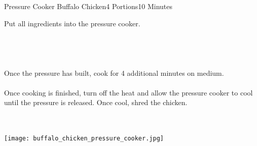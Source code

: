 \begin{recipe}{Pressure Cooker Buffalo Chicken}{4 Portions}{10 Minutes}

Put all ingredients into the pressure cooker.\\~\\~\\~\\~\\

\newstep
Once the pressure has built, cook for 4 additional minutes on medium.\\~\\

\newstep
Once cooking is finished, turn off the heat and allow the pressure cooker to cool until the pressure is released. Once cool, shred the chicken.

\end{recipe}

\begin{center}
~\\~\\
\texttt{[image: buffalo\_chicken\_pressure\_cooker.jpg]}
\end{center}